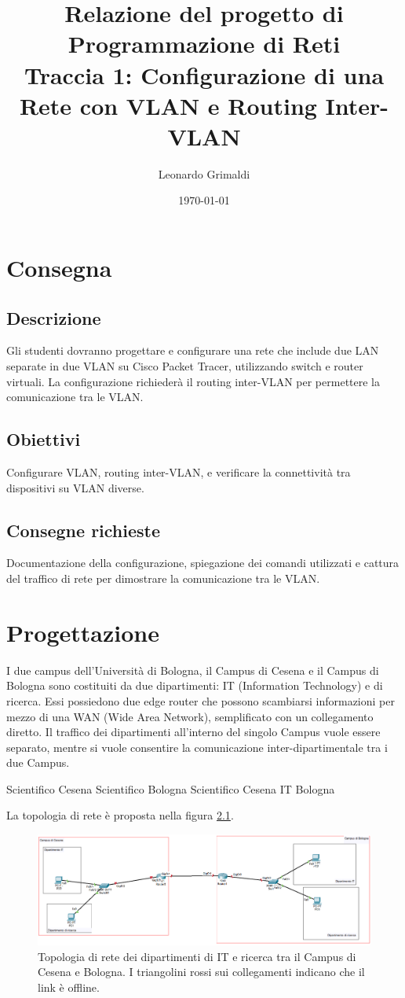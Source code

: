 \documentclass[a4paper,12pt]{report}
\title{Relazione del progetto di Programmazione di Reti 
    \\ Traccia 1: Configurazione di una Rete con VLAN e Routing Inter-VLAN}
\author{Leonardo Grimaldi}
\date{\today}
\newcommand{\myexample}[2]{
    \begin{tcolorbox}[colback=black!5!white,colframe=black,title={Esempio: #1}]
        #2
    \end{tcolorbox}
}
\begin{document}
\maketitle
\tableofcontents
\chapter{Consegna}
\section{Descrizione}
Gli studenti dovranno progettare e configurare una rete che include due LAN separate in due VLAN su Cisco Packet Tracer, utilizzando switch e router virtuali. La configurazione richiederà il routing inter-VLAN per permettere la comunicazione tra le VLAN.
\section{Obiettivi}
Configurare VLAN, routing inter-VLAN, e verificare la connettività tra dispositivi su VLAN diverse.
\section{Consegne richieste}
Documentazione della configurazione, spiegazione dei comandi utilizzati e cattura del traffico di rete per dimostrare la comunicazione tra le VLAN.
\chapter{Progettazione}
\label{chap:progettazione}
I due campus dell'Università di Bologna, il Campus di Cesena e il Campus di Bologna sono costituiti da due dipartimenti: IT (Information Technology) e di ricerca.
%
Essi possiedono due edge router che possono scambiarsi informazioni per mezzo di una WAN (Wide Area Network), semplificato con un collegamento diretto.
%
Il traffico dei dipartimenti all'interno del singolo Campus vuole essere separato, mentre si vuole consentire la comunicazione inter-dipartimentale tra i due Campus.
%
\myexample{Ping tra i Campus}{
    Scientifico Cesena Scientifico Bologna
    Scientifico Cesena  IT Bologna
}
La topologia di rete è proposta nella figura \ref{fig:topologia_offline}. 
\begin{figure}[H]
\includegraphics[width=\textwidth]{offline_topology_with_departments.png}
\caption{
    Topologia di rete dei dipartimenti di IT e ricerca tra il Campus di Cesena e Bologna.
    I triangolini rossi sui collegamenti indicano che il link è offline.
    }
\label{fig:topologia_offline}
\end{figure}
\end{document}

